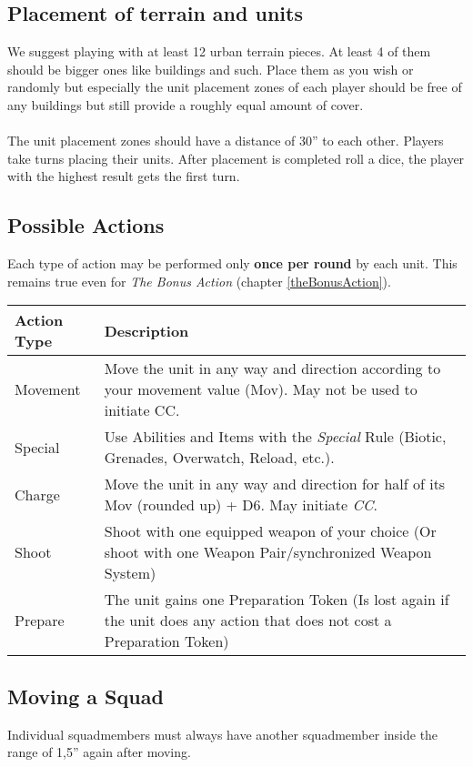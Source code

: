 \documentclass[
	11pt,
	toc=bibliography
	]{article}
\begin{document}
\subsection{Placement of terrain and units}\label{placementTerrainUnits}
We suggest playing with at least 12 urban terrain pieces. At least 4 of them should be bigger ones like buildings and such. Place them as you wish or randomly but especially the unit placement zones of each player should be free of any buildings but still provide a roughly equal amount of cover.\\\\
The unit placement zones should have a distance of 30'' to each other. Players take turns placing their units. After placement is completed roll a dice, the player with the highest result gets the first turn.

\subsection{Possible Actions}\label{possibleActions}
Each type of action may be performed only \textbf{once per round} by each unit. This remains true even for \textit{The Bonus Action} (chapter \ref{theBonusAction}).
{\renewcommand{\arraystretch}{2}
\begin{longtable}{V{.32\textwidth} V{.62\textwidth}}
\bf Action Type & \bf Description \\ 
\hline 
Movement & Move the unit in any way and direction according to your movement value (Mov). May not be used to initiate CC.\\ 
Special & Use Abilities and Items with the \textit{Special} Rule (Biotic, Grenades, Overwatch, Reload, etc.).\\ 
Charge & Move the unit in any way and direction for half of its Mov (rounded up) + D6. May initiate \textit{CC}.\\ 
Shoot & Shoot with one equipped weapon of your choice (Or shoot with one Weapon Pair/synchronized Weapon System)\\ 
Prepare & The unit gains one Preparation Token (Is lost again if the unit does any action that does not cost a Preparation Token)\\
\end{longtable}}

\subsection{Moving a Squad}\label{movingASquad}
Individual squadmembers must always have another squadmember inside the range of 1,5'' again after moving.
\end{document}
